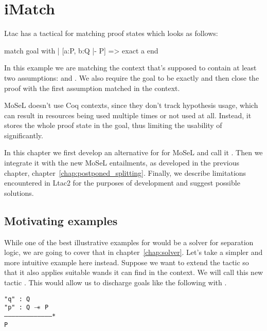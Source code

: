 \chapter{iMatch}
\label{chap:imatch}

Ltac has a tactical for matching proof states which looks as follows:

\begin{coq}
match goal with
| [a:P, b:Q |- P] => exact a
end
\end{coq}

In this example we are matching the context that's supposed to contain at least two assumptions:  and .
We also require the goal to be exactly  and then close the proof with the first assumption matched in the context.

MoSeL doesn't use Coq contexts, since they don't track hypothesis usage, which can result in resources being used multiple times or not used at all.
Instead, it stores the whole proof state in the goal, thus limiting the usability of  significantly.

In this chapter we first develop an alternative for  for MoSeL and call it .
Then we integrate it with the new MoSeL entailments, as developed in the previous chapter, chapter~\ref{chap:postponed_splitting}.
Finally, we describe limitations encountered in Ltac2 for the purposes of development and suggest possible solutions.

\section{Motivating examples} %

While one of the best illustrative examples for  would be a solver for separation logic, we are going to cover that in chapter~\ref{chap:solver}.
Let's take a simpler and more intuitive example here instead.
Suppose we want to extend the  tactic so that it also applies suitable wands it can find in the context.
We will call this new tactic .
This would allow us to discharge goals like the following with .

\begin{minipage}{\linewidth}
\texttt{"q" : Q\\
"p" : Q $\mathrel{-\mkern-6mu*}$ P\\
---------------------------------------*\\
P
}
\end{minipage}

